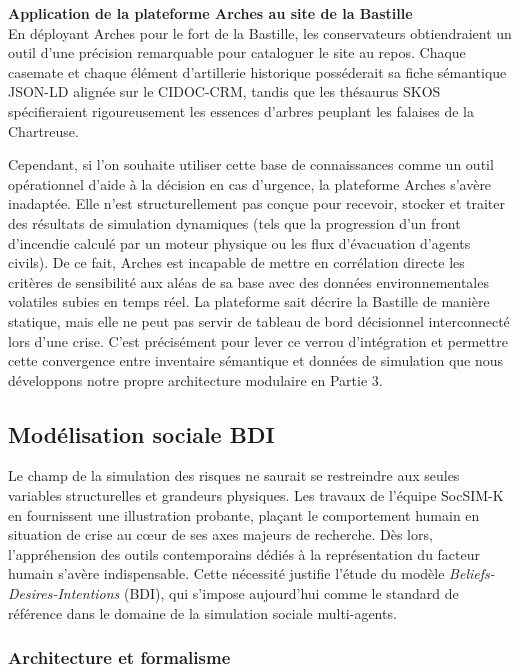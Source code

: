\documentclass{article}
\begin{document}
\begin{filrouge}
\textbf{Application de la plateforme Arches au site de la Bastille} \\
En déployant Arches pour le fort de la Bastille, les conservateurs obtiendraient un outil d'une précision remarquable pour cataloguer le site au repos. Chaque casemate et chaque élément d'artillerie historique posséderait sa fiche sémantique JSON-LD alignée sur le CIDOC-CRM, tandis que les thésaurus SKOS spécifieraient rigoureusement les essences d'arbres peuplant les falaises de la Chartreuse.

Cependant, si l'on souhaite utiliser cette base de connaissances comme un outil opérationnel d'aide à la décision en cas d'urgence, la plateforme Arches s'avère inadaptée. Elle n'est structurellement pas conçue pour recevoir, stocker et traiter des résultats de simulation dynamiques (tels que la progression d'un front d'incendie calculé par un moteur physique ou les flux d'évacuation d'agents civils). De ce fait, Arches est incapable de mettre en corrélation directe les critères de sensibilité aux aléas de sa base avec des données environnementales volatiles subies en temps réel. La plateforme sait décrire la Bastille de manière statique, mais elle ne peut pas servir de tableau de bord décisionnel interconnecté lors d'une crise. C'est précisément pour lever ce verrou d'intégration et permettre cette convergence entre inventaire sémantique et données de simulation que nous développons notre propre architecture modulaire en Partie 3.
\end{filrouge}
\subsection{Modélisation sociale BDI}

Le champ de la simulation des risques ne saurait se restreindre aux seules variables structurelles et grandeurs physiques. Les travaux de l'équipe SocSIM-K en fournissent une illustration probante, plaçant le comportement humain en situation de crise au cœur de ses axes majeurs de recherche. Dès lors, l'appréhension des outils contemporains dédiés à la représentation du facteur humain s'avère indispensable. Cette nécessité justifie l'étude du modèle \emph{Beliefs-Desires-Intentions} (BDI), qui s'impose aujourd'hui comme le standard de référence dans le domaine de la simulation sociale multi-agents.

\subsubsection{Architecture et formalisme}
\end{document}
